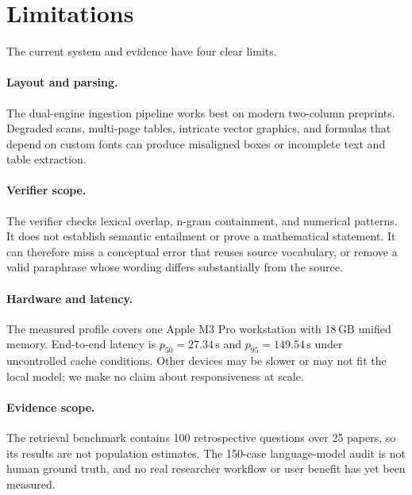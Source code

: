 \section*{Limitations}
\label{sec:limitations}

The current system and evidence have four clear limits.

\paragraph{Layout and parsing.}
The dual-engine ingestion pipeline works best on modern two-column preprints. Degraded scans, multi-page tables, intricate vector graphics, and formulas that depend on custom fonts can produce misaligned boxes or incomplete text and table extraction.

\paragraph{Verifier scope.}
The verifier checks lexical overlap, n-gram containment, and numerical patterns. It does not establish semantic entailment or prove a mathematical statement. It can therefore miss a conceptual error that reuses source vocabulary, or remove a valid paraphrase whose wording differs substantially from the source.

\paragraph{Hardware and latency.}
The measured profile covers one Apple M3 Pro workstation with 18\,GB unified memory. End-to-end latency is $p_{50}=27.34$\,s and $p_{95}=149.54$\,s under uncontrolled cache conditions. Other devices may be slower or may not fit the local model; we make no claim about responsiveness at scale.

\paragraph{Evidence scope.}
The retrieval benchmark contains 100 retrospective questions over 25 papers, so its results are not population estimates. The 150-case language-model audit is not human ground truth, and no real researcher workflow or user benefit has yet been measured.
